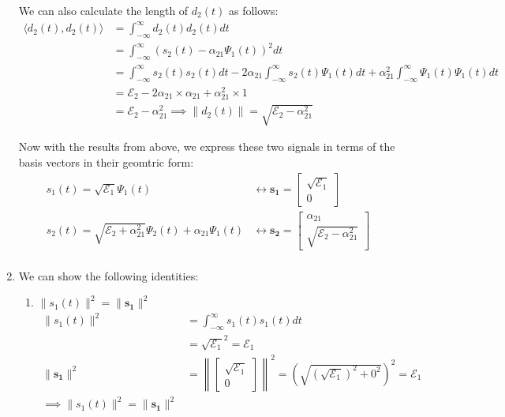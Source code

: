 \documentclass{article}
\begin{document}
\begin{enumerate}[label=2.\arabic*]
    We can also calculate the length of $d_2(t)$ as follows:
    \begin{align*}
        \langle d_2(t), d_2(t) \rangle &= \int_{-\infty}^{\infty} d_2(t) d_2(t) dt \\
        &= \int_{-\infty}^{\infty} \left(s_2(t) - \alpha_{21}\Psi_1(t)\right)^2 dt \\
        &= \int_{-\infty}^{\infty} s_2(t) s_2(t) dt - 2\alpha_{21} \int_{-\infty}^{\infty} s_2(t) \Psi_1(t) dt + \alpha_{21}^2 \int_{-\infty}^{\infty} \Psi_1(t) \Psi_1(t) dt \\
        &= \mathcal{E}_2 - 2\alpha_{21} \times \alpha_{21} + \alpha_{21}^2 \times 1 \\
        &= \mathcal{E}_2 - \alpha_{21}^2
        \implies \|d_2(t)\| = \sqrt{\mathcal{E}_2 - \alpha_{21}^2}
    \end{align*}

    Now with the results from above, we express these two signals in terms of the basis vectors in their geomtric form:
    \begin{align*}
        s_1(t) = \sqrt{\mathcal{E}_1} \Psi_1(t) &\longleftrightarrow \mathbf{s_1} = \begin{bmatrix}
            \sqrt{\mathcal{E}_1} \\
            0
        \end{bmatrix} \\
        s_2(t) = \sqrt{\mathcal{E}_2 + \alpha_{21}^2} \Psi_2(t) + \alpha_{21} \Psi_1(t) &\longleftrightarrow \mathbf{s_2} = \begin{bmatrix}
            \alpha_{21} \\
            \sqrt{\mathcal{E}_2 - \alpha_{21}^2}
        \end{bmatrix} \\
    \end{align*}



    \item We can show the following identities:
    \begin{enumerate}[label=\alph*.]
        \item $\|s_1(t)\|^2 = \|\mathbf{s_1}\|^2$
        \begin{align*}
            \|s_1(t)\|^2 &= \int_{-\infty}^{\infty} s_1(t) s_1(t) dt \\
            &= \sqrt{\mathcal{E}_1}^2 = \mathcal{E}_1 \\
            \|\mathbf{s_1}\|^2 &= \left\|\begin{bmatrix}
                \sqrt{\mathcal{E}_1} \\
                0
            \end{bmatrix}\right\|^2 = \left(\sqrt{\left(\sqrt{\mathcal{E}_1}\right)^2 + 0^2}\right)^2 = \mathcal{E}_1 \\
            \implies \|s_1(t)\|^2 = \|\mathbf{s_1}\|^2
        \end{align*}


\end{enumerate}
\end{enumerate}
\end{document}
